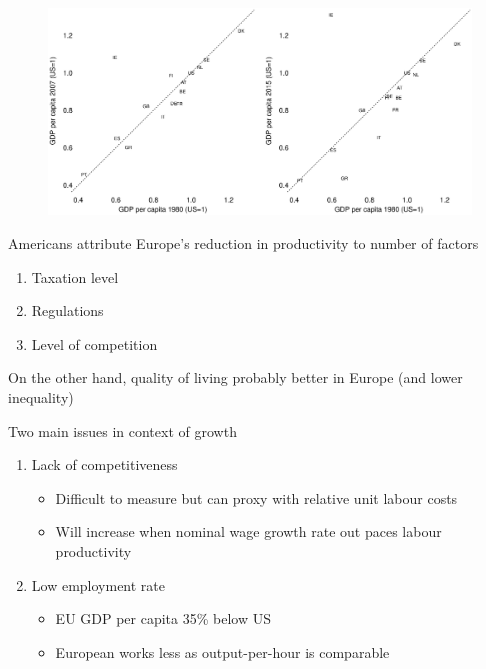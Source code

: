 \documentclass{beamer}
\begin{document}
\begin{frame}
  \begin{figure}
    \includegraphics[scale=.3]{versus_us3.eps}
  \end{figure}
\end{frame}

\begin{frame}
  Americans attribute Europe's reduction in productivity to number of factors
  \begin{enumerate}
  \item Taxation level
  \item Regulations
  \item Level of competition
\end{enumerate}
\medskip
On the other hand, quality of living probably better in Europe (and lower inequality)
\end{frame}

\begin{frame}
  Two main issues in context of growth
  \begin{enumerate}
    \item Lack of competitiveness
    \begin{itemize}
      \item Difficult to measure but can proxy with relative unit labour costs
      \item Will increase when nominal wage growth rate out paces labour productivity
    \end{itemize}
    \item Low employment rate
    \begin{itemize}
      \item EU GDP per capita 35\% below US
      \item European works less as output-per-hour is comparable
    \end{itemize}
  \end{enumerate}
\end{frame}
\end{document}
